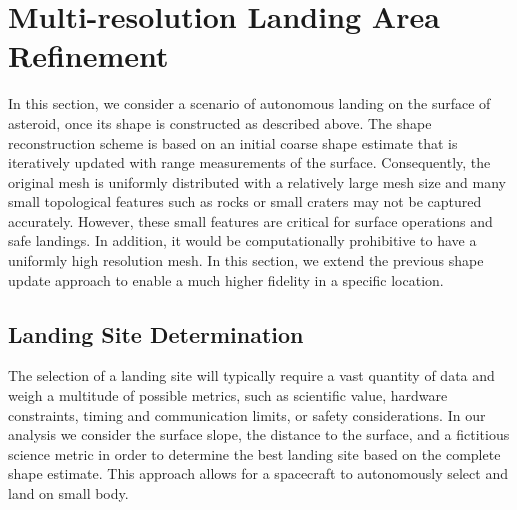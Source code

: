 \documentclass[journal]{new-aiaa}
\begin{document}
\section{Multi-resolution Landing Area Refinement}\label{sec:landing_refinement}

In this section, we consider a scenario of autonomous landing on the surface of asteroid, once its shape is constructed as described above.
The shape reconstruction scheme is based on an initial coarse shape estimate that is iteratively updated with range measurements of the surface.
Consequently, the original mesh is uniformly distributed with a relatively large mesh size and many small topological features such as rocks or small craters may not be captured accurately.
However, these small features are critical for surface operations and safe landings.
In addition, it would be computationally prohibitive to have a uniformly high resolution mesh.
In this section, we extend the previous shape update approach to enable a much higher fidelity in a specific location.

\subsection{Landing Site Determination}

The selection of a landing site will typically require a vast quantity of data and weigh a multitude of possible metrics, such as scientific value, hardware constraints, timing and communication limits, or safety considerations. 
In our analysis we consider the surface slope, the distance to the surface, and a fictitious science metric in order to determine the best landing site based on the complete shape estimate.
This approach allows for a spacecraft to autonomously select and land on small body.
\end{document}
